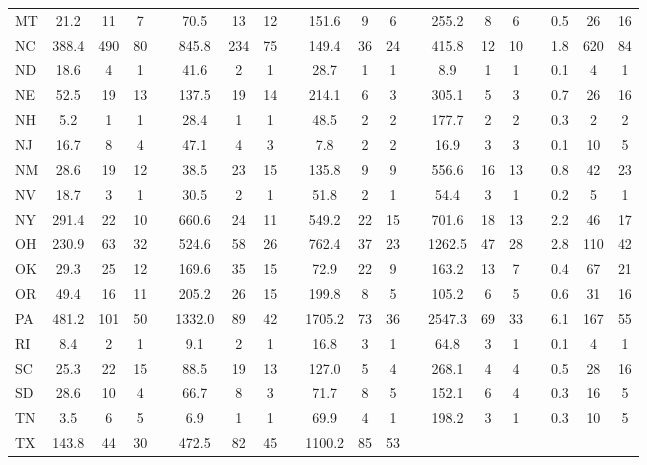 \documentclass[11pt]{article}
\begin{document}
\begin{table}[t]
\begin{adjustbox}{max width=\textwidth}
\begin{tabular}{l ccc c ccc c ccc c ccc | c ccc}
 MT & 21.2 & 11 &  7 & 
 & 70.5 & 13 & 12 & 
 & 151.6 &  9 &  6 & 
 & 255.2 &  8 &  6 & 
 & 0.5 & 26 & 16 \\
 NC & 388.4 & 490 & 80 & 
 & 845.8 & 234 & 75 & 
 & 149.4 & 36 & 24 & 
 & 415.8 & 12 & 10 & 
 & 1.8 & 620 & 84 \\
 ND & 18.6 &  4 &  1 & 
 & 41.6 &  2 &  1 & 
 & 28.7 &  1 &  1 & 
 & 8.9 &  1 &  1 & 
 & 0.1 &  4 &  1 \\
 NE & 52.5 & 19 & 13 & 
 & 137.5 & 19 & 14 & 
 & 214.1 &  6 &  3 & 
 & 305.1 &  5 &  3 & 
 & 0.7 & 26 & 16 \\
 NH & 5.2 &  1 &  1 & 
 & 28.4 &  1 &  1 & 
 & 48.5 &  2 &  2 & 
 & 177.7 &  2 &  2 & 
 & 0.3 &  2 &  2 \\
 NJ & 16.7 &  8 &  4 & 
 & 47.1 &  4 &  3 & 
 & 7.8 &  2 &  2 & 
 & 16.9 &  3 &  3 & 
 & 0.1 & 10 &  5 \\
 NM & 28.6 & 19 & 12 & 
 & 38.5 & 23 & 15 & 
 & 135.8 &  9 &  9 & 
 & 556.6 & 16 & 13 & 
 & 0.8 & 42 & 23 \\
 NV & 18.7 &  3 &  1 & 
 & 30.5 &  2 &  1 & 
 & 51.8 &  2 &  1 & 
 & 54.4 &  3 &  1 & 
 & 0.2 &  5 &  1 \\
 NY & 291.4 & 22 & 10 & 
 & 660.6 & 24 & 11 & 
 & 549.2 & 22 & 15 & 
 & 701.6 & 18 & 13 & 
 & 2.2 & 46 & 17 \\
 OH & 230.9 & 63 & 32 & 
 & 524.6 & 58 & 26 & 
 & 762.4 & 37 & 23 & 
 & 1262.5 & 47 & 28 & 
 & 2.8 & 110 & 42 \\
 OK & 29.3 & 25 & 12 & 
 & 169.6 & 35 & 15 & 
 & 72.9 & 22 &  9 & 
 & 163.2 & 13 &  7 & 
 & 0.4 & 67 & 21 \\
 OR & 49.4 & 16 & 11 & 
 & 205.2 & 26 & 15 & 
 & 199.8 &  8 &  5 & 
 & 105.2 &  6 &  5 & 
 & 0.6 & 31 & 16 \\
 PA & 481.2 & 101 & 50 & 
 & 1332.0 & 89 & 42 & 
 & 1705.2 & 73 & 36 & 
 & 2547.3 & 69 & 33 & 
 & 6.1 & 167 & 55 \\
 RI & 8.4 &  2 &  1 & 
 & 9.1 &  2 &  1 & 
 & 16.8 &  3 &  1 & 
 & 64.8 &  3 &  1 & 
 & 0.1 &  4 &  1 \\
 SC & 25.3 & 22 & 15 & 
 & 88.5 & 19 & 13 & 
 & 127.0 &  5 &  4 & 
 & 268.1 &  4 &  4 & 
 & 0.5 & 28 & 16 \\
 SD & 28.6 & 10 &  4 & 
 & 66.7 &  8 &  3 & 
 & 71.7 &  8 &  5 & 
 & 152.1 &  6 &  4 & 
 & 0.3 & 16 &  5 \\
 TN & 3.5 &  6 &  5 & 
 & 6.9 &  1 &  1 & 
 & 69.9 &  4 &  1 & 
 & 198.2 &  3 &  1 & 
 & 0.3 & 10 &  5 \\
 TX & 143.8 & 44 & 30 & 
 & 472.5 & 82 & 45 & 
 & 1100.2 & 85 & 53 & 

\end{tabular}
\end{adjustbox}
\end{table}
\end{document}
